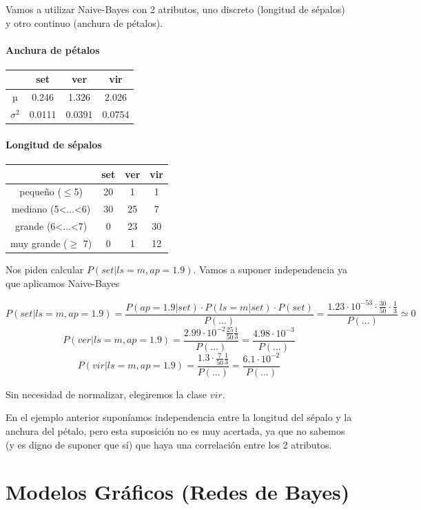 \documentclass{apuntes}
\begin{document}
\begin{example}
Vamos a utilizar Naive-Bayes con 2 atributos, uno discreto (longitud de sépalos) y otro continuo (anchura de pétalos).



\paragraph{Anchura de pétalos}
\begin{tabular}{c|ccc}
& set & ver & vir \\\hline
µ & 0.246 & 1.326 & 2.026\\
$σ^2$ & 0.0111 & 0.0391 & 0.0754
\end{tabular}

\paragraph{Longitud de sépalos}
\begin{tabular}{c|ccc}
& set & ver & vir \\\hline
pequeño ($\leq$5) & 20 & 1 & 1\\
mediano (5<...<6) & 30 & 25 & 7\\
grande (6<...<7) & 0 & 23 & 30\\
muy grande ($\geq$ 7) & 0 & 1 & 12
\end{tabular}

Nos piden calcular $P(set|ls=m,ap=1.9)$. Vamos a suponer independencia ya que aplicamos Naive-Bayes

\[
P(set|ls=m,ap=1.9) = \frac{P(ap=1.9|set)·P(ls=m|set)·P(set)}{P(...)} = \frac{1.23·10^{-53}·\frac{30}{50}·\frac{1}{3}}{P(...)} \simeq 0
\]
\[
P(ver|ls=m,ap=1.9) = \frac{2.99·10^{-2}\frac{25}{50}\frac{1}{3}}{P(...)} = \frac{4.98·10^{-3}}{P(...)}
\]
\[
P(vir|ls=m,ap=1.9) = \frac{1.3·\frac{7}{50}\frac{1}{3}}{P(...)} = \frac{6.1·10^{-2}}{P(...)}
\]

Sin necesidad de normalizar, elegiremos la clase $vir$. 

\end{example}

En el ejemplo anterior suponíamos independencia entre la longitud del sépalo y la anchura del pétalo, pero esta suposición no es muy acertada, ya que no sabemos (y es digno de suponer que sí) que haya una correlación entre los 2 atributos.


\section{Modelos Gráficos (Redes de Bayes)}
\end{document}
